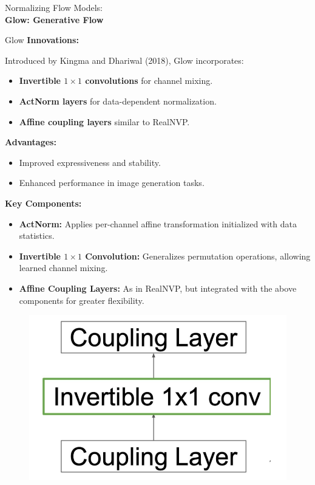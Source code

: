 \begin{frame}[allowframebreaks]{}
    \LARGE Normalizing Flow Models: \\[1.5ex] \textbf{Glow: Generative Flow}
\end{frame}

\begin{frame}[allowframebreaks]{Glow}
\textbf{Innovations:}

Introduced by Kingma and Dhariwal (2018), Glow incorporates:
\begin{itemize}
    \item \textbf{Invertible $1\times1$ convolutions} for channel mixing.
    \item \textbf{ActNorm layers} for data-dependent normalization.
    \item \textbf{Affine coupling layers} similar to RealNVP.
\end{itemize}

\textbf{Advantages:}
\begin{itemize}
    \item Improved expressiveness and stability.
    \item Enhanced performance in image generation tasks.
\end{itemize}
\framebreak
\textbf{Key Components:}
\begin{itemize}
    \item \textbf{ActNorm:} Applies per-channel affine transformation initialized with data statistics.
    \item \textbf{Invertible $1\times1$ Convolution:} Generalizes permutation operations, allowing learned channel mixing.
    \item \textbf{Affine Coupling Layers:} As in RealNVP, but integrated with the above components for greater flexibility.
\end{itemize}

\begin{figure}
    \centering
    \includegraphics[height=0.4\textheight, width=\textwidth, keepaspectratio]{images/norm-flow/nfm_glow.png}
\end{figure}


\end{frame}
